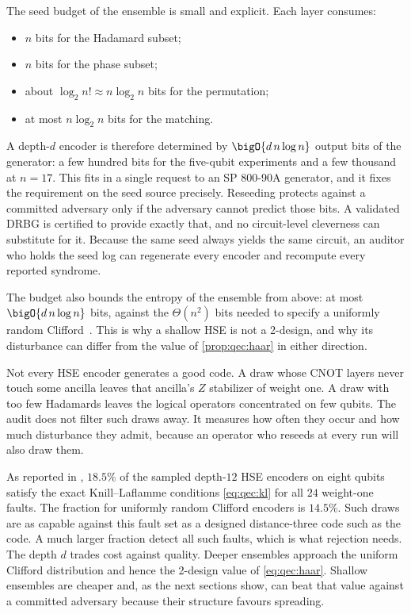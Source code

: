 The seed budget of the ensemble is small and explicit. Each layer consumes:
\begin{itemize}
  \item $n$ bits for the Hadamard subset;
  \item $n$ bits for the phase subset;
  \item about $\log_2 n!\approx n\log_2 n$ bits for the permutation;
  \item at most $n\log_2 n$ bits for the matching.
\end{itemize}
A depth-$d$ encoder is therefore determined by $\bigO{d\,n\log n}$ output bits of the generator: a few hundred bits for the five-qubit experiments and a few thousand at $n=17$. This fits in a single request to an SP 800-90A generator, and it fixes the requirement on the seed source precisely. Reseeding protects against a committed adversary only if the adversary cannot predict those bits. A validated DRBG is certified to provide exactly that, and no circuit-level cleverness can substitute for it. Because the same seed always yields the same circuit, an auditor who holds the seed log can regenerate every encoder and recompute every reported syndrome.

The budget also bounds the entropy of the ensemble from above: at most $\bigO{d\,n\log n}$ bits, against the $\Theta(n^{2})$ bits needed to specify a uniformly random Clifford~\cite{koenig2014clifford}. This is why a shallow HSE is not a 2-design, and why its disturbance can differ from the value of \cref{prop:qec:haar} in either direction.

Not every HSE encoder generates a good code. A draw whose CNOT layers never touch some ancilla leaves that ancilla's $Z$ stabilizer of weight one. A draw with too few Hadamards leaves the logical operators concentrated on few qubits. The audit does not filter such draws away. It measures how often they occur and how much disturbance they admit, because an operator who reseeds at every run will also draw them.

As reported in \cite{guo2026qecaudit}, $18.5\%$ of the sampled depth-$12$ HSE encoders on eight qubits satisfy the exact Knill--Laflamme conditions \cref{eq:qec:kl} for all $24$ weight-one faults. The fraction for uniformly random Clifford encoders is $14.5\%$. Such draws are as capable against this fault set as a designed distance-three code such as the  code. A much larger fraction detect all such faults, which is what rejection needs. The depth $d$ trades cost against quality. Deeper ensembles approach the uniform Clifford distribution and hence the 2-design value of \cref{eq:qec:haar}. Shallow ensembles are cheaper and, as the next sections show, can beat that value against a committed adversary because their structure favours spreading.

